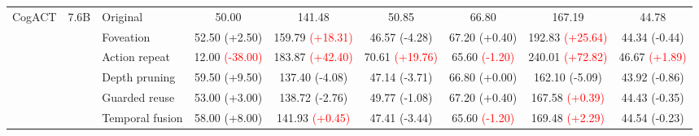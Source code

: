 \begin{table}[t]
\begin{tabular}{cclcccccc}
\multirow[c]{6}{*}{CogACT}
& \multirow[c]{6}{*}{7.6B}
& Original & 50.00 & 141.48 & 50.85 & 66.80 & 167.19 & 44.78 \\
& & Foveation & 52.50 {\scriptsize\textcolor{green!50!black}{(+2.50)}} & 159.79 {\scriptsize\textcolor{red}{(+18.31)}} & 46.57 {\scriptsize\textcolor{green!50!black}{(-4.28)}} & 67.20 {\scriptsize\textcolor{green!50!black}{(+0.40)}} & 192.83 {\scriptsize\textcolor{red}{(+25.64)}} & 44.34 {\scriptsize\textcolor{green!50!black}{(-0.44)}} \\
& & Action repeat & 12.00 {\scriptsize\textcolor{red}{(-38.00)}} & 183.87 {\scriptsize\textcolor{red}{(+42.40)}} & 70.61 {\scriptsize\textcolor{red}{(+19.76)}} & 65.60 {\scriptsize\textcolor{red}{(-1.20)}} & 240.01 {\scriptsize\textcolor{red}{(+72.82)}} & 46.67 {\scriptsize\textcolor{red}{(+1.89)}} \\
& & Depth pruning & 59.50 {\scriptsize\textcolor{green!50!black}{(+9.50)}} & 137.40 {\scriptsize\textcolor{green!50!black}{(-4.08)}} & 47.14 {\scriptsize\textcolor{green!50!black}{(-3.71)}} & 66.80 {\scriptsize\textcolor{green!50!black}{(+0.00)}} & 162.10 {\scriptsize\textcolor{green!50!black}{(-5.09)}} & 43.92 {\scriptsize\textcolor{green!50!black}{(-0.86)}} \\
& & Guarded reuse & 53.00 {\scriptsize\textcolor{green!50!black}{(+3.00)}} & 138.72 {\scriptsize\textcolor{green!50!black}{(-2.76)}} & 49.77 {\scriptsize\textcolor{green!50!black}{(-1.08)}} & 67.20 {\scriptsize\textcolor{green!50!black}{(+0.40)}} & 167.58 {\scriptsize\textcolor{red}{(+0.39)}} & 44.43 {\scriptsize\textcolor{green!50!black}{(-0.35)}} \\
& & Temporal fusion & 58.00 {\scriptsize\textcolor{green!50!black}{(+8.00)}} & 141.93 {\scriptsize\textcolor{red}{(+0.45)}} & 47.41 {\scriptsize\textcolor{green!50!black}{(-3.44)}} & 65.60 {\scriptsize\textcolor{red}{(-1.20)}} & 169.48 {\scriptsize\textcolor{red}{(+2.29)}} & 44.54 {\scriptsize\textcolor{green!50!black}{(-0.23)}} \\
\cmidrule(lr){1-9}


\end{tabular}
\end{table}
